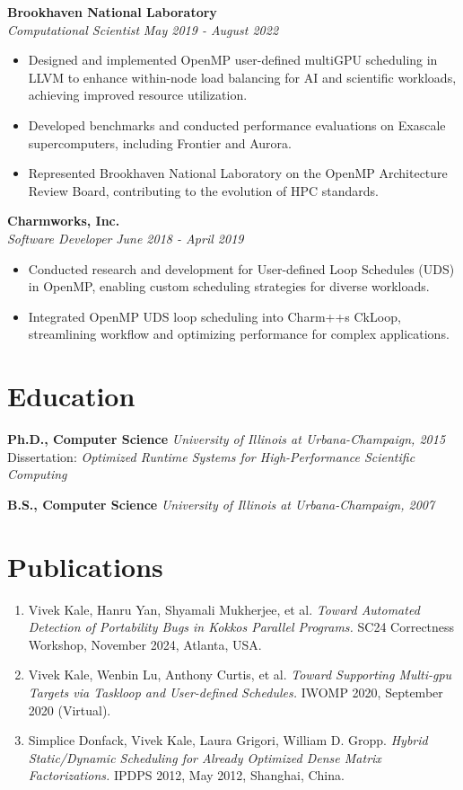 \documentclass[11pt]{article}
\begin{document}
\textbf{Brookhaven National Laboratory}\\
\textit{Computational Scientist} \hfill \textit{May 2019 - August 2022}
\begin{itemize}[noitemsep,topsep=0pt]
    \item Designed and implemented OpenMP user-defined multiGPU scheduling in LLVM to enhance within-node load balancing for AI and scientific workloads, achieving improved resource utilization.
    \item Developed benchmarks and conducted performance evaluations on Exascale supercomputers, including Frontier and Aurora.
    \item Represented Brookhaven National Laboratory on the OpenMP Architecture Review Board, contributing to the evolution of HPC standards.
\end{itemize}

\textbf{Charmworks, Inc.}\\
\textit{Software Developer} \hfill \textit{June 2018 - April 2019}
\begin{itemize}[noitemsep,topsep=0pt]
    \item Conducted research and development for User-defined Loop Schedules (UDS) in OpenMP, enabling custom scheduling strategies for diverse workloads.
    \item Integrated OpenMP UDS loop scheduling into Charm++\textquotesingle s CkLoop, streamlining workflow and optimizing performance for complex applications.
\end{itemize}

\section*{Education}
\textbf{Ph.D., Computer Science} \hfill \textit{University of Illinois at Urbana-Champaign, 2015}\\
Dissertation: \textit{\textquotedbl Optimized Runtime Systems for High-Performance Scientific Computing\textquotedbl}

\textbf{B.S., Computer Science} \hfill \textit{University of Illinois at Urbana-Champaign, 2007}

\section*{Publications}
\begin{enumerate}[noitemsep,topsep=0pt]
    \item Vivek Kale, Hanru Yan, Shyamali Mukherjee, et al. \textit{Toward Automated Detection of Portability Bugs in Kokkos Parallel Programs.} SC24 Correctness Workshop, November 2024, Atlanta, USA.
    \item Vivek Kale, Wenbin Lu, Anthony Curtis, et al. \textit{Toward Supporting Multi-gpu Targets via Taskloop and User-defined Schedules.} IWOMP 2020, September 2020 (Virtual).
    \item Simplice Donfack, Vivek Kale, Laura Grigori, William D. Gropp. \textit{Hybrid Static/Dynamic Scheduling for Already Optimized Dense Matrix Factorizations.} IPDPS 2012, May 2012, Shanghai, China.
\end{enumerate}
\end{document}

